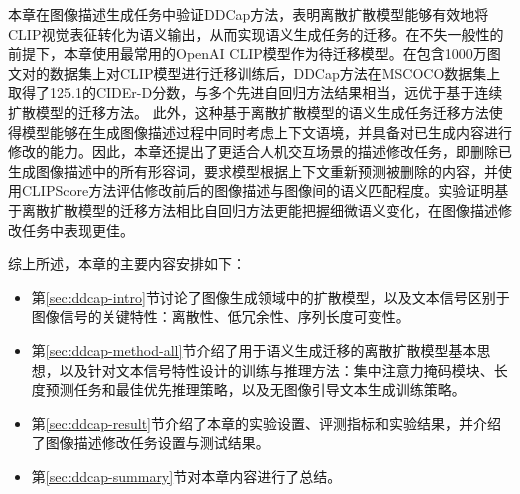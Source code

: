 本章在图像描述生成任务\cite{karpathy2015deep, vinyals2015show}中验证DDCap方法，表明离散扩散模型能够有效地将CLIP视觉表征转化为语义输出，从而实现语义生成任务的迁移。在不失一般性的前提下，本章使用最常用的OpenAI CLIP\cite{radford2021learning}模型作为待迁移模型。在包含1000万图文对的数据集上对CLIP模型进行迁移训练后，DDCap方法在MSCOCO数据集\cite{chen2015microsoft}上取得了125.1的CIDEr-D分数\cite{cider}，与多个先进自回归方法\cite{OSCAR,VinVL,UFO,ViTCap}结果相当，远优于基于连续扩散模型的迁移方法。
此外，这种基于离散扩散模型的语义生成任务迁移方法使得模型能够在生成图像描述过程中同时考虑上下文语境，并具备对已生成内容进行修改的能力。因此，本章还提出了更适合人机交互场景的描述修改任务，即删除已生成图像描述中的所有形容词，要求模型根据上下文重新预测被删除的内容，并使用CLIPScore\cite{CLIPScore}方法评估修改前后的图像描述与图像间的语义匹配程度。实验证明基于离散扩散模型的迁移方法相比自回归方法更能把握细微语义变化，在图像描述修改任务中表现更佳。


综上所述，本章的主要内容安排如下：
\begin{itemize}
    \item 第\ref{sec:ddcap-intro}节讨论了图像生成领域中的扩散模型，以及文本信号区别于图像信号的关键特性：离散性、低冗余性、序列长度可变性。
    \item 第\ref{sec:ddcap-method-all}节介绍了用于语义生成迁移的离散扩散模型基本思想，以及针对文本信号特性设计的训练与推理方法：集中注意力掩码模块、长度预测任务和最佳优先推理策略，以及无图像引导文本生成训练策略。
    \item 第\ref{sec:ddcap-result}节介绍了本章的实验设置、评测指标和实验结果，并介绍了图像描述修改任务设置与测试结果。
    \item 第\ref{sec:ddcap-summary}节对本章内容进行了总结。
\end{itemize}

